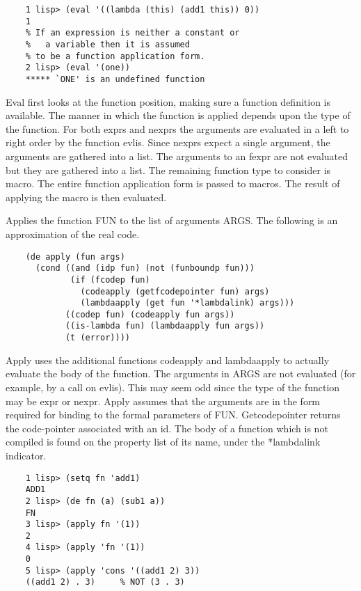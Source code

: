 \begin{verbatim}
    1 lisp> (eval '((lambda (this) (add1 this)) 0))
    1
    % If an expression is neither a constant or
    %	a variable then it is assumed
    % to be a function application form.
    2 lisp> (eval '(one))
    ***** `ONE' is an undefined function
\end{verbatim}
    Eval  first  looks  at  the function position, making sure a
    function definition is available.  The manner in  which  the
    function  is  applied depends upon the type of the function.
    For both exprs and nexprs the arguments are evaluated  in  a
    left  to  right  order  by the function evlis.  Since nexprs
    expect a single argument, the arguments are gathered into  a
    list.   The arguments to an fexpr are not evaluated but they
    are gathered into a list.  The remaining  function  type  to
    consider  is macro.  The entire function application form is
    passed to macros.  The result of applying the macro is  then
    evaluated.


{    Applies the function FUN to the list of arguments ARGS.  The
    following is an approximation of the real code.
}
\begin{verbatim}
    (de apply (fun args)
      (cond ((and (idp fun) (not (funboundp fun)))
             (if (fcodep fun)
               (codeapply (getfcodepointer fun) args)
               (lambdaapply (get fun '*lambdalink) args)))
            ((codep fun) (codeapply fun args))
            ((is-lambda fun) (lambdaapply fun args))
            (t (error))))
\end{verbatim}
    Apply   uses   the   additional   functions   codeapply  and
    lambdaapply to actually evaluate the body of  the  function.
    The  arguments  in ARGS are not evaluated (for example, by a
    call on evlis).  This may seem odd since  the  type  of  the
    function  may  be  expr  or  nexpr.   Apply assumes that the
    arguments are in the form required for binding to the formal
    parameters of FUN.  Getcodepointer returns the  code-pointer
    associated  with an id.  The body of a function which is not
    compiled is found on the property list of  its  name,  under
    the *lambdalink indicator.

\begin{verbatim}
    1 lisp> (setq fn 'add1)
    ADD1
    2 lisp> (de fn (a) (sub1 a))
    FN
    3 lisp> (apply fn '(1))
    2
    4 lisp> (apply 'fn '(1))
    0
    5 lisp> (apply 'cons '((add1 2) 3))
    ((add1 2) . 3)     % NOT (3 . 3)
\end{verbatim}

